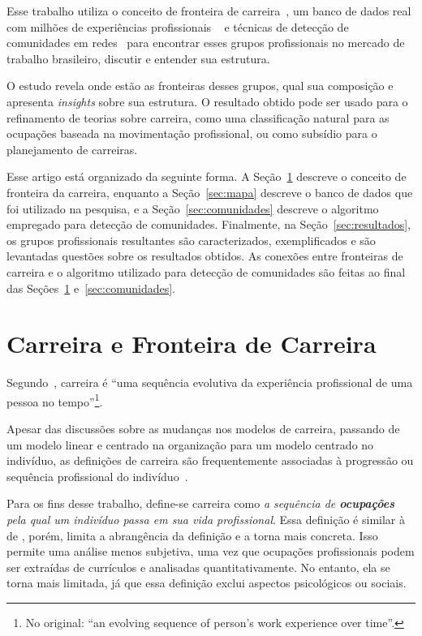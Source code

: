 \documentclass[
  article,
  11pt,
  a4paper,
  english,
  brazil,
  sumario=tradicional]{abntex2}
\begin{document}
Esse trabalho utiliza o conceito de fronteira de carreira~\cite{Gunz2007-hr}, um banco de dados real com milhões de experiências profissionais ~\cite{VAGAS_Tecnologia2015-yv} e técnicas de detecção de comunidades em redes~\cite{Rosvall2009-sd} para encontrar esses grupos profissionais no mercado de trabalho brasileiro, discutir e entender sua estrutura.

O estudo revela onde estão as fronteiras desses grupos, qual sua composição e apresenta \textit{insights} sobre sua estrutura. O resultado obtido pode ser usado para o refinamento de teorias sobre carreira, como uma classificação natural para as ocupações baseada na movimentação profissional, ou como subsídio para o planejamento de carreiras.

Esse artigo está organizado da seguinte forma. A Seção~\ref{sec:carreira} descreve o conceito de fronteira da carreira, enquanto a Seção~\ref{sec:mapa} descreve o banco de dados que foi utilizado na pesquisa, e a Seção~\ref{sec:comunidades} descreve o algoritmo empregado para detecção de comunidades. Finalmente, na Seção~\ref{sec:resultados}, os grupos profissionais resultantes são caracterizados, exemplificados e são levantadas questões sobre os resultados obtidos. As conexões entre fronteiras de carreira e o algoritmo utilizado para detecção de comunidades são feitas ao final das Seções~\ref{sec:carreira} e~\ref{sec:comunidades}.

\section{Carreira e Fronteira de Carreira} \label{sec:carreira}

Segundo~, carreira é \foreignquote{english}{uma sequência evolutiva da experiência profissional de uma pessoa no tempo}\footnote{No original: \enquote{an evolving sequence of person's work experience over time}.}.

Apesar das discussões sobre as mudanças nos modelos de carreira, passando de um modelo linear e centrado na organização para um modelo centrado no indivíduo, as definições de carreira são frequentemente associadas à progressão ou sequência profissional do indivíduo~\cite{Baruch2004-oy,Sullivan2009-xb,Bendassolli2009-bg}.

Para os fins desse trabalho, define-se carreira como \textit{a sequência de \textbf{ocupações} pela qual um indivíduo passa em sua vida profissional}. Essa definição é similar à de , porém, limita a abrangência da definição e a torna mais concreta. Isso permite uma análise menos subjetiva, uma vez que ocupações profissionais podem ser extraídas de currículos e analisadas quantitativamente. No entanto, ela se torna mais limitada, já que essa definição exclui aspectos psicológicos ou sociais.
\end{document}
